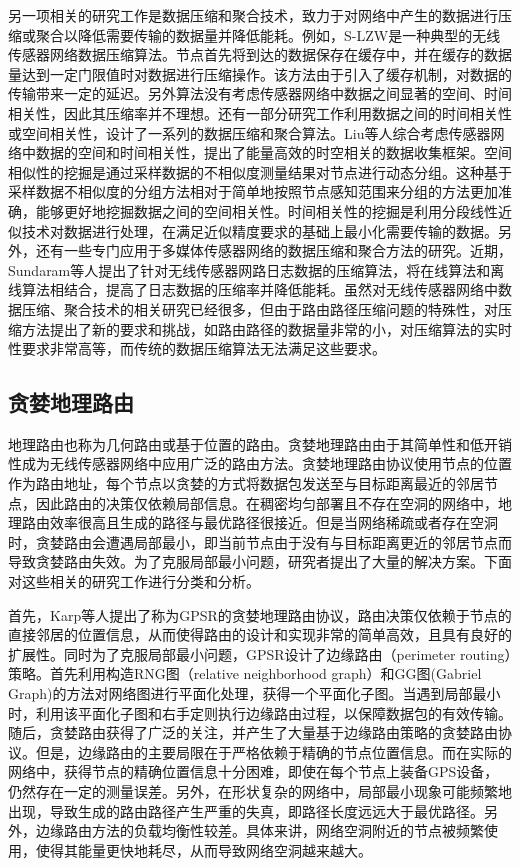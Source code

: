 另一项相关的研究工作是数据压缩和聚合技术，致力于对网络中产生的数据进行压缩或聚合以降低需要传输的数据量并降低能耗。例如，S-LZW是一种典型的无线传感器网络数据压缩算法。节点首先将到达的数据保存在缓存中，并在缓存的数据量达到一定门限值时对数据进行压缩操作。该方法由于引入了缓存机制，对数据的传输带来一定的延迟。另外算法没有考虑传感器网络中数据之间显著的空间、时间相关性，因此其压缩率并不理想。还有一部分研究工作利用数据之间的时间相关性或空间相关性，设计了一系列的数据压缩和聚合算法。Liu等人综合考虑传感器网络中数据的空间和时间相关性，提出了能量高效的时空相关的数据收集框架。空间相似性的挖掘是通过采样数据的不相似度测量结果对节点进行动态分组。这种基于采样数据不相似度的分组方法相对于简单地按照节点感知范围来分组的方法更加准确，能够更好地挖掘数据之间的空间相关性。时间相关性的挖掘是利用分段线性近似技术对数据进行处理，在满足近似精度要求的基础上最小化需要传输的数据。另外，还有一些专门应用于多媒体传感器网络的数据压缩和聚合方法的研究。近期，Sundaram等人提出了针对无线传感器网路日志数据的压缩算法，将在线算法和离线算法相结合，提高了日志数据的压缩率并降低能耗。虽然对无线传感器网络中数据压缩、聚合技术的相关研究已经很多，但由于路由路径压缩问题的特殊性，对压缩方法提出了新的要求和挑战，如路由路径的数据量非常的小，对压缩算法的实时性要求非常高等，而传统的数据压缩算法无法满足这些要求。
\subsection{贪婪地理路由}
地理路由也称为几何路由或基于位置的路由。贪婪地理路由由于其简单性和低开销性成为无线传感器网络中应用广泛的路由方法。贪婪地理路由协议使用节点的位置作为路由地址，每个节点以贪婪的方式将数据包发送至与目标距离最近的邻居节点，因此路由的决策仅依赖局部信息。在稠密均匀部署且不存在空洞的网络中，地理路由效率很高且生成的路径与最优路径很接近。但是当网络稀疏或者存在空洞时，贪婪路由会遭遇局部最小，即当前节点由于没有与目标距离更近的邻居节点而导致贪婪路由失效。为了克服局部最小问题，研究者提出了大量的解决方案。下面对这些相关的研究工作进行分类和分析。

首先，Karp等人提出了称为GPSR的贪婪地理路由协议，路由决策仅依赖于节点的直接邻居的位置信息，从而使得路由的设计和实现非常的简单高效，且具有良好的扩展性。同时为了克服局部最小问题，GPSR设计了边缘路由（perimeter routing）策略。首先利用构造RNG图（relative neighborhood graph）和GG图(Gabriel Graph)的方法对网络图进行平面化处理，获得一个平面化子图。当遇到局部最小时，利用该平面化子图和右手定则执行边缘路由过程，以保障数据包的有效传输。随后，贪婪路由获得了广泛的关注，并产生了大量基于边缘路由策略的贪婪路由协议。但是，边缘路由的主要局限在于严格依赖于精确的节点位置信息。而在实际的网络中，获得节点的精确位置信息十分困难，即使在每个节点上装备GPS设备，仍然存在一定的测量误差。另外，在形状复杂的网络中，局部最小现象可能频繁地出现，导致生成的路由路径产生严重的失真，即路径长度远远大于最优路径。另外，边缘路由方法的负载均衡性较差。具体来讲，网络空洞附近的节点被频繁使用，使得其能量更快地耗尽，从而导致网络空洞越来越大。

